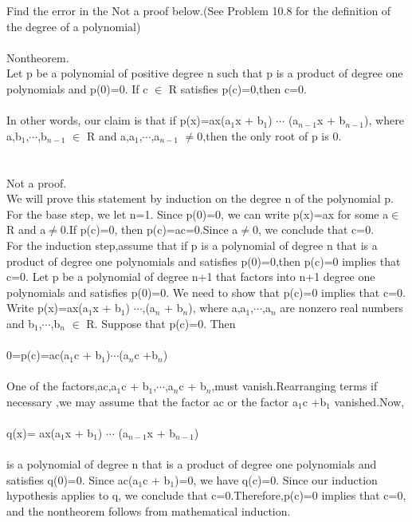 \documentclass[11pt, a4paper, UTF8]{ctexart}
\begin{document}
\begin{problem}[UD: 17.13]
Find the error in the Not a proof below.(See Problem 10.8 for the definition of the degree of a polynomial)\\
\\
Nontheorem.\\
Let p be a polynomial of positive degree n such that p is a product of degree one  polynomials and p(0)=0. If c $\in$ R satisfies p(c)=0,then c=0.\\
\\
   In other words, our claim is that if p(x)=ax(a$_1$x + b$_1$) $\cdots$ (a$_{n-1}$x + b$_{n-1}$), where a,b$_1$,$\cdots$,b$_{n-1}$ $\in$ R and a,a$_1$,$\cdots$,a$_{n-1}$ $\not=0$,then the only root of p is 0.\\
   \\
   \\
Not a proof.\\
We will prove this statement by induction on the degree n of the polynomial p.\\
  For the base step, we let n=1. Since p(0)=0, we can write p(x)=ax for some a$\in$R and a$\not=$0.If p(c)=0, then p(c)=ac=0.Since a$\not=$0, we conclude that c=0.\\
  For the induction step,assume that if p is a polynomial of degree n that is a product of degree one polynomials and satisfies p(0)=0,then p(c)=0 implies that c=0. Let p be a polynomial of degree n+1 that factors into n+1 degree one polynomials and satisfies p(0)=0. We need to show that p(c)=0 implies that c=0. Write p(x)=ax(a$_1$x + b$_1$) $\cdots$,(a$_n$ + b$_n$), where a,a$_1$,$\cdots$,a$_n$ are nonzero real numbers and b$_1$,$\cdots$,b$_n$ $\in$ R. Suppose that p(c)=0. Then\\
  \\
    0=p(c)=ac(a$_1$c + b$_1$)$\cdots$(a$_n$c +b$_n$)\\
    \\
  One of the factors,ac,a$_1$c + b$_1$,$\cdots$,a$_n$c + b$_n$,must vanish.Rearranging terms if necessary ,we may assume  that the factor ac or the factor a$_1$c +b$_1$ vanished.Now,\\
  \\
  q(x)= ax(a$_1$x + b$_1$) $\cdots$ (a$_{n-1}$x + b$_{n-1}$)\\
  \\
  is a polynomial of degree n that is a product of degree one polynomials and satisfies q(0)=0. Since ac(a$_1$c + b$_1$)=0, we have q(c)=0. Since our induction hypothesis applies to q, we conclude that c=0.Therefore,p(c)=0 implies that c=0, and the nontheorem follows from mathematical induction.\\


\end{problem}
\end{document}
